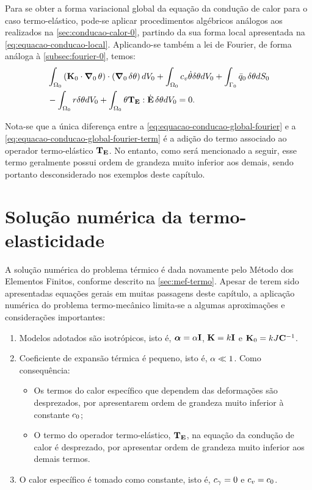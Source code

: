 \documentclass[Tese.tex]{subfiles}
\begin{document}
Para se obter a forma variacional global da equação da condução de calor para o caso termo-elástico, pode-se aplicar procedimentos algébricos análogos aos realizados na \autoref{sec:conducao-calor-0}, partindo da sua forma local apresentada na \cref{eq:equacao-conducao-local}. Aplicando-se também a lei de Fourier, de forma análoga à \autoref{subsec:fourier-0}, temos:
\begin{equation}\label{eq:equacao-conducao-global-fourier}
\begin{aligned}
&\int_{\Omega_0}\left(\mathbf{K}_0\cdot\boldsymbol{\nabla}_0\,\theta\right)\cdot\left(\boldsymbol{\nabla}_0\,\delta\theta\right) dV_0 + \int_{\Omega_0}c_v\dot{\theta}\delta\theta dV_0 + \int_{\Gamma_0}\bar{q}_0\,\delta\theta dS_0 \\&- \int_{\Omega_0}r\delta\theta dV_0 + \int_{\Omega_0}\theta\mathbf{T}_{\mathbf{E}}:\dot{\mathbf{E}}\,\delta\theta dV_0 = 0.
\end{aligned}
\end{equation}

Nota-se que a única diferença entre a \cref{eq:equacao-conducao-global-fourier} e a \cref{eq:equacao-conducao-global-fourier-term} é a adição do termo associado ao operador termo-elástico $\mathbf{T}_{\mathbf{E}}$. No entanto, como será mencionado a seguir, esse termo geralmente possui ordem de grandeza muito inferior aos demais, sendo portanto desconsiderado nos exemplos deste capítulo.

\section{Solução numérica da termo-elasticidade}\label{sec:solucao-numerica-termo-elasticidade}

A solução numérica do problema térmico é dada novamente pelo Método dos Elementos Finitos, conforme descrito na \autoref{sec:mef-termo}. Apesar de terem sido apresentadas equações gerais em muitas passagens deste capítulo, a aplicação numérica do problema termo-mecânico limita-se a algumas aproximações e considerações importantes:
\begin{enumerate}%
	\item Modelos adotados são isotrópicos, isto é, $\boldsymbol{\alpha} = \alpha\mathbf{I}$, $\mathbf{K} = k\mathbf{I}$ e $\mathbf{K}_0 = kJ\mathbf{C}^{-1}$.
	\item Coeficiente de expansão térmica é pequeno, isto é, $\alpha\ll 1$. Como consequência:
	\begin{itemize}%
		\item Os termos do calor específico que dependem das deformações são desprezados, por apresentarem ordem de grandeza muito inferior à constante $c_0$;
		\item O termo do operador termo-elástico, $\mathbf{T}_{\mathbf{E}}$, na equação da condução de calor é desprezado, por apresentar ordem de grandeza muito inferior aos demais termos.
	\end{itemize}
	\item O calor específico é tomado como constante, isto é, $c_{\gamma} = 0$ e $c_v=c_0$.
\end{enumerate}
\end{document}
